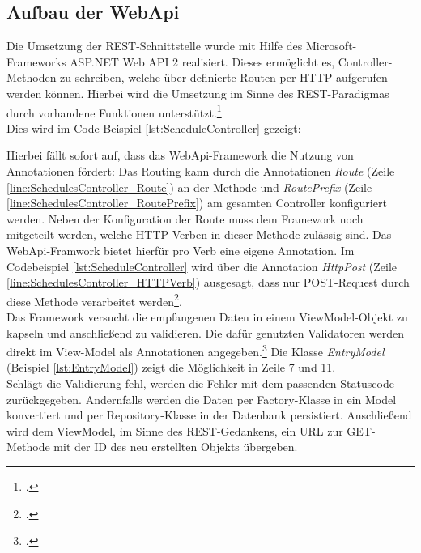 \subsection{Aufbau der WebApi}
\label{ssec:aufbau-webapi}
Die Umsetzung der REST-Schnittstelle wurde mit Hilfe des Microsoft-Frameworks \ac{ASP.NET Web API 2} realisiert. Dieses ermöglicht es, Controller-Methoden zu schreiben, welche über definierte Routen per HTTP aufgerufen werden können. Hierbei wird die Umsetzung im Sinne des REST-Paradigmas durch vorhandene Funktionen unterstützt.\footcite[S. 2ff.]{Building-a-REST-Service}\\
Dies wird im Code-Beispiel \ref{lst:ScheduleController} gezeigt:

Hierbei fällt sofort auf, dass das WebApi-Framework die Nutzung von Annotationen fördert: Das Routing kann durch die Annotationen \textit{Route} (Zeile \ref{line:SchedulesController_Route}) an der Methode und \textit{RoutePrefix} (Zeile \ref{line:SchedulesController_RoutePrefix}) am gesamten Controller konfiguriert werden. Neben der Konfiguration der Route muss dem Framework noch mitgeteilt werden, welche HTTP-Verben in dieser Methode zulässig sind. Das WebApi-Framwork bietet hierfür pro Verb eine eigene Annotation. Im Codebeispiel \ref{lst:ScheduleController} wird über die Annotation \textit{HttpPost} (Zeile \ref{line:SchedulesController_HTTPVerb}) ausgesagt, dass nur POST-Request durch diese Methode verarbeitet werden\footcite{webApi-AttributeRouting}. \\
Das Framework versucht die empfangenen Daten in einem ViewModel-Objekt zu kapseln und anschließend zu validieren. Die dafür genutzten Validatoren werden direkt im View-Model als Annotationen angegeben.\footcite{webApi-Validation} Die Klasse \textit{EntryModel} (Beispiel \ref{lst:EntryModel}) zeigt die Möglichkeit in Zeile 7 und 11. \\ 
Schlägt die Validierung fehl, werden die Fehler mit dem passenden Statuscode zurückgegeben. Andernfalls werden die Daten per \ac{Factory}-Klasse in ein Model konvertiert und per \ac{Repository}-Klasse in der Datenbank persistiert. Anschließend wird dem ViewModel, im Sinne des REST-Gedankens, ein URL zur GET-Methode mit der ID des neu erstellten Objekts übergeben. 

